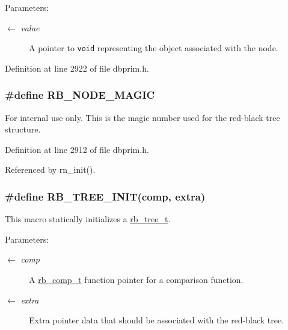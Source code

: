 \begin{Desc}
\item[Parameters:]
\begin{description}
\item[\mbox{$\leftarrow$} {\em value}]A pointer to {\tt void} representing the object associated with the node.\end{description}
\end{Desc}


Definition at line 2922 of file dbprim.h.\hypertarget{group__dbprim__rbtree_ga29}{
\subsubsection[RB\_\-NODE\_\-MAGIC]{\setlength{\rightskip}{0pt plus 5cm}\#define RB\_\-NODE\_\-MAGIC}}
\label{group__dbprim__rbtree_ga29}


\begin{Desc}
\item[For internal use only.]
This is the magic number used for the red-black tree structure.\end{Desc}


Definition at line 2912 of file dbprim.h.

Referenced by rn\_\-init().\hypertarget{group__dbprim__rbtree_ga17}{
\subsubsection[RB\_\-TREE\_\-INIT]{\setlength{\rightskip}{0pt plus 5cm}\#define RB\_\-TREE\_\-INIT(comp, extra)}}
\label{group__dbprim__rbtree_ga17}


This macro statically initializes a \hyperlink{group__dbprim__rbtree_ga0}{rb\_\-tree\_\-t}.

\begin{Desc}
\item[Parameters:]
\begin{description}
\item[\mbox{$\leftarrow$} {\em comp}]A \hyperlink{group__dbprim__rbtree_ga3}{rb\_\-comp\_\-t} function pointer for a comparison function. \item[\mbox{$\leftarrow$} {\em extra}]Extra pointer data that should be associated with the red-black tree.\end{description}
\end{Desc}


